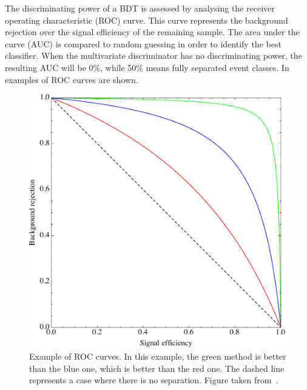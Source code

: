 %


The discriminating power of a BDT is assessed by analysing the receiver operating characteristic (ROC) curve. This curve represents the background rejection over the signal efficiency of the remaining sample. The area under the curve (AUC) is compared to  random guessing in order to identify the best classifier. 
When the multivariate discriminator has no discriminating power, the resulting AUC will be 0\%, while 50\%  means fully separated event classes. In  examples of ROC curves are shown. 
\begin{figure}[htbp]
	\centering
	\includegraphics[width=0.7\linewidth]{3_Analysis_techniques/Figures/ROClies}
	\caption{Example of ROC curves. In this example, the green method is better than the blue one, which is better than the red one. The dashed line represents a case where there is no separation. Figure taken from~\cite{lies}.}
	\label{fig:ROC}
\end{figure}




